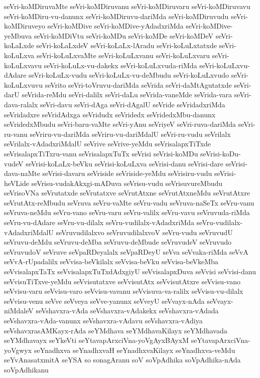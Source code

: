 {seVri-koMDiruvaMte
seVri-koMDiruvanu
seVri-koMDiruvaru
seVri-koMDiruvavu
seVri-koMDiru-vu-danunx
seVri-koMDiruvu-dariMda
seVri-koMDiruvudu
seVri-koMDiruveyo
seVri-koMDive
seVri-koMDive-yAdadxriMda
seVri-koMDive-yeMbuva
seVri-koMDiVtu
seVri-koMDu
seVri-koMDe
seVri-koMDeV
seVri-koLaLxde
seVri-koLaLxdeV
seVri-koLaLx-lAradu
seVri-koLuLxtatxde
seVri-koLuLxva
seVri-koLuLxvaMte
seVri-koLuLxvanu
seVri-koLuLxvaru
seVri-koLuLxvavu
seVri-koLuLx-vu-dakekx
seVri-koLuLxvuda-riMda
seVri-koLuLxvu-dAdare
seVri-koLuLx-vudu
seVri-koLuLx-vu-deMbudu
seVri-koLuLxvudo
seVri-koLuLxvuvu
seVrito
seVri-toVruvu-dariMda
seVrida
seVri-daMtAgutatxde
seVri-darU
seVrida-reMdu
seVri-dalilx
seVri-daLu
seVrida-vaneMde
seVrida-vara
seVri-dava-ralalx
seVri-davu
seVri-dAga
seVri-dAgalU
seVride
seVridadxriMda
seVridadxre
seVridAdxga
seVridudx
seVridedx
seVridedxMbu-danunx
seVridedxMbudu
seVri-baru-vaMte
seVri-yAnu
seVriyeV
seVri-ruva-dariMda
seVri-ru-vanu
seVriru-vu-dariMda
seVriru-vu-dariMdalU
seVri-ru-vudu
seVrilalx
seVrilalx-vAdadxriMdalU
seVrive
seVrive-yeMdu
seVrisalapxTiTxde
seVrisalapxTiTxru-vanu
seVrisalapxTuTx
seVrisi
seVrisi-koMDu
seVrisi-koDu-vudeV
seVrisi-koLaLx-beVku
seVrisi-koLuLxva
seVrisi-danu
seVrisi-dare
seVrisi-dava-naMte
seVrisi-davaru
seVriside
seVriside-yeMdu
seVrisiru-vudu
seVrisi-heVLide
seVrisu-vudakAkxgi-mADuva
seVrisu-vudu
seVrisuvureMbudu
seVrisoVNa
seVrutatxde
seVrutatxve
seVrutAtxne
seVrutAtxneMdu
seVrutAtxre
seVrutAtx-reMbudu
seVruva
seVru-vaMte
seVru-vadu
seVruva-naSeTx
seVru-vanu
seVruva-neMdu
seVru-vano
seVru-varu
seVru-valilx
seVru-vavu
seVruvuda-riMda
seVru-vu-dAdare
seVru-vu-dilalx
seVru-vudilalx-vAdadxriMda
seVru-vudilalx-vAdadxriMdalU
seVruvudilalxvo
seVruvudilalxvoV
seVru-vudu
seVruvudU
seVruvu-deMdu
seVruvu-deMba
seVruvu-deMbude
seVruvudeV
seVruvudo
seVruvudoV
seVruve
seVpaRDeyalalx
seVpaRDeyU
seVva
seVvaka-riMda
seVvA
seVvA-rUpadalilx
seVvisa-beVkilalx
seVvisa-beVku
seVvisa-beVkeMba
seVvisalapxTaTx
seVvisalapxTuTxdAdxgiyU
seVvisalapxDuva
seVvisi
seVvisi-danu
seVvisuTiTxve-yeMdu
seVvisutatxve
seVvisutAtx
seVvisutAtxre
seVvisu-vano
seVvisu-varu
seVvisu-varo
seVvisu-vavanu
seVvisuva-va-ralilx
seVvisu-vu-dilalx
seVvisu-venu
seVve
seVveya
seVve-yanunx
seVveyU
seVvayx-nAda
seVvayx-niMdaleV
seVshavxra-vAda
seVshavxra-vAdakekx
seVshavxra-vAdada
seVshavxra-vAda-vanunx
seVshavxra-vAdavu
seVshavxra-vAdiya
seVshavxrasAMKayx-rAda
seYMdhava
seYMdhavaKilayx
seYMdhavada
seYMdhavayx
seYkeVti
seYtavapArxciVna-yoVgAyxBAyxM
seYtavapArxciVna-yoVgwyx
seYnadhxva
seYnadhxvaH
seYnadhxvaKilayx
seYnadhxva-veMdu
seYvAnasatxmitA
seYSA
so
sonagAranu
soV
soVpAdhika
soVpAdhika-nAda
soVpAdhikanu
}
